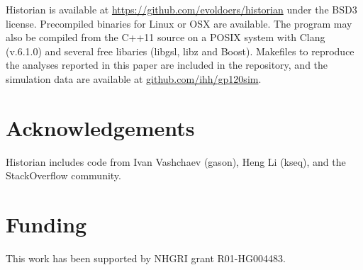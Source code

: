 Historian is available at \url{https://github.com/evoldoers/historian} under the BSD3 license.
Precompiled binaries for Linux or OSX are available.
The program may also be compiled from the C++11 source
on a POSIX system with Clang (v.6.1.0) and several free libaries (libgsl, libz and Boost).
Makefiles to reproduce the analyses reported in this paper
are included in the repository, and the simulation data
are available at \url{github.com/ihh/gp120sim}.

\section*{Acknowledgements}

Historian includes code from Ivan Vashchaev (gason), Heng Li (kseq), %
and the StackOverflow community.

\section*{Funding}

This work has been supported by NHGRI grant R01-HG004483.


%
%
%
%
%
%
%
%



